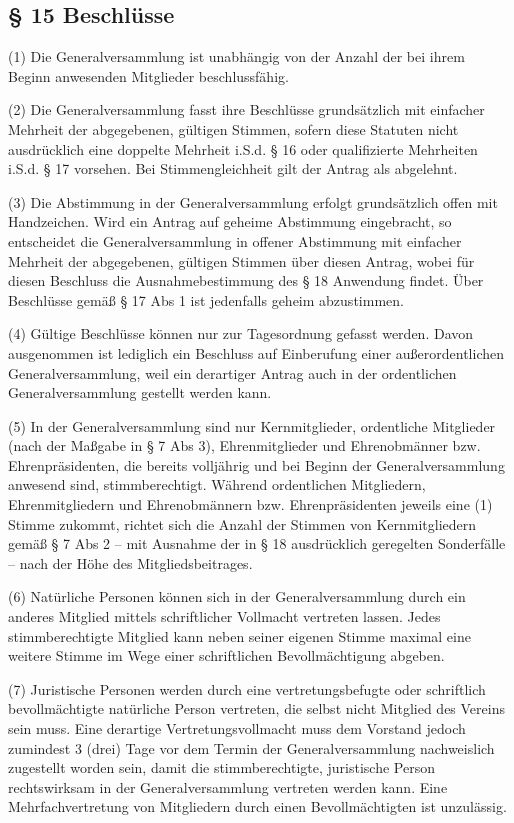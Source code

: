\documentclass[11pt,a4paper]{article}
\begin{document}
\subsection{§ 15
Beschlüsse}

(1)
Die Generalversammlung ist unabhängig von der Anzahl der bei ihrem Beginn anwesenden Mitglieder beschlussfähig.

(2)
Die Generalversammlung fasst ihre Beschlüsse grundsätzlich mit einfacher Mehrheit der abgegebenen, gültigen Stimmen, sofern diese Statuten nicht ausdrücklich eine doppelte Mehrheit i.S.d. § 16 oder qualifizierte Mehrheiten i.S.d. § 17 vorsehen.
Bei Stimmengleichheit gilt der Antrag als abgelehnt.

(3)
Die Abstimmung in der Generalversammlung erfolgt grundsätzlich offen mit Handzeichen.
Wird ein Antrag auf geheime Abstimmung eingebracht, so entscheidet die Generalversammlung in offener Abstimmung mit einfacher Mehrheit der abgegebenen, gültigen Stimmen über diesen Antrag, wobei für diesen Beschluss die Ausnahmebestimmung des § 18 Anwendung findet.
Über Beschlüsse gemäß § 17 Abs 1 ist jedenfalls geheim abzustimmen.

(4)
Gültige Beschlüsse können nur zur Tagesordnung gefasst werden.
Davon ausgenommen ist lediglich ein Beschluss auf Einberufung einer außerordentlichen Generalversammlung, weil ein derartiger Antrag auch in der ordentlichen Generalversammlung gestellt werden kann.

(5)
In der Generalversammlung sind nur Kernmitglieder, ordentliche Mitglieder (nach der Maßgabe in § 7 Abs 3), Ehrenmitglieder und Ehrenobmänner bzw. Ehrenpräsidenten, die bereits volljährig und bei Beginn der Generalversammlung anwesend sind, stimmberechtigt.
Während ordentlichen Mitgliedern, Ehrenmitgliedern und Ehrenobmännern bzw. Ehrenpräsidenten jeweils eine (1) Stimme zukommt, richtet sich die Anzahl der Stimmen von Kernmitgliedern gemäß § 7 Abs 2 – mit Ausnahme der in § 18 ausdrücklich geregelten Sonderfälle – nach der Höhe des Mitgliedsbeitrages.

(6)
Natürliche Personen können sich in der Generalversammlung durch ein anderes Mitglied mittels schriftlicher Vollmacht vertreten lassen.
Jedes stimmberechtigte Mitglied kann neben seiner eigenen Stimme maximal eine weitere Stimme im Wege einer schriftlichen Bevollmächtigung abgeben.

(7)
Juristische Personen werden durch eine vertretungsbefugte oder schriftlich bevollmächtigte natürliche Person vertreten, die selbst nicht Mitglied des Vereins sein muss.
Eine derartige Vertretungsvollmacht muss dem Vorstand jedoch zumindest 3 (drei) Tage vor dem Termin der Generalversammlung nachweislich zugestellt worden sein, damit die stimmberechtigte, juristische Person rechtswirksam in der Generalversammlung vertreten werden kann.
Eine Mehrfachvertretung von Mitgliedern durch einen Bevollmächtigten ist unzulässig.
\end{document}
